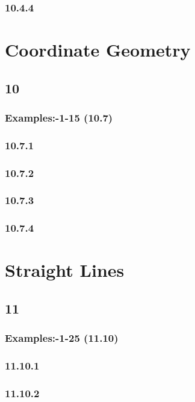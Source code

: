 \documentclass[11pt]{book}
\begin{document}
\subsection{10.4.4}

\chapter{Coordinate Geometry}
\section{10}
\subsection{Examples:-1-15 (10.7)}

\subsection{10.7.1}

\subsection{10.7.2}

\subsection{10.7.3}

\subsection{10.7.4}

\chapter{Straight Lines}
\section{11}
\subsection{Examples:-1-25 (11.10)}

\subsection{11.10.1}

\subsection{11.10.2}

\end{document}
